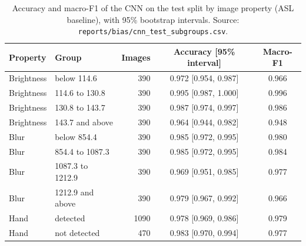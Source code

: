 \begin{table}[htbp]
  \centering
  \caption{Accuracy and macro-F1 of the CNN on the test split by image property (ASL baseline), with 95\% bootstrap intervals. Source: \texttt{reports/bias/cnn\_test\_subgroups.csv}.}
  \label{tab:bias-groups}
  \small
  \begin{tabular}{llrcc}
    \toprule
    Property & Group & Images & Accuracy [95\% interval] & Macro-F1 \\
    \midrule
    Brightness & below 114.6 & 390 & 0.972 [0.954, 0.987] & 0.966 \\
    Brightness & 114.6 to 130.8 & 390 & 0.995 [0.987, 1.000] & 0.996 \\
    Brightness & 130.8 to 143.7 & 390 & 0.987 [0.974, 0.997] & 0.986 \\
    Brightness & 143.7 and above & 390 & 0.964 [0.944, 0.982] & 0.948 \\
    \midrule
    Blur & below 854.4 & 390 & 0.985 [0.972, 0.995] & 0.980 \\
    Blur & 854.4 to 1087.3 & 390 & 0.985 [0.972, 0.995] & 0.984 \\
    Blur & 1087.3 to 1212.9 & 390 & 0.969 [0.951, 0.985] & 0.977 \\
    Blur & 1212.9 and above & 390 & 0.979 [0.967, 0.992] & 0.966 \\
    \midrule
    Hand & detected & 1090 & 0.978 [0.969, 0.986] & 0.979 \\
    Hand & not detected & 470 & 0.983 [0.970, 0.994] & 0.977 \\
    \bottomrule
  \end{tabular}
\end{table}


